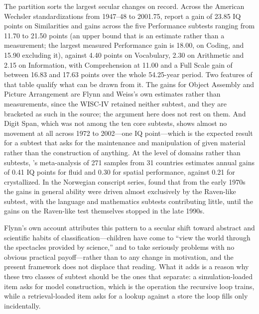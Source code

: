 \documentclass[12pt,a4paper]{article}
\begin{document}
The partition sorts the largest secular changes on record. Across the American Wechsler standardizations from 1947--48 to 2001.75, \citet[Table 2]{FlynnWeiss2007} report a gain of 23.85 IQ points on Similarities and gains across the five Performance subtests ranging from 11.70 to 21.50 points (an upper bound that is an estimate rather than a measurement; the largest measured Performance gain is 18.00, on Coding, and 15.90 excluding it), against 4.40 points on Vocabulary, 2.30 on Arithmetic and 2.15 on Information, with Comprehension at 11.00 and a Full Scale gain of between 16.83 and 17.63 points over the whole 54.25-year period. Two features of that table qualify what can be drawn from it. The gains for Object Assembly and Picture Arrangement are Flynn and Weiss's own estimates rather than measurements, since the WISC-IV retained neither subtest, and they are bracketed as such in the source; the argument here does not rest on them. And Digit Span, which was not among the ten core subtests, shows almost no movement at all across 1972 to 2002---\hspace{0pt}one IQ point---\hspace{0pt}which is the expected result for a subtest that asks for the maintenance and manipulation of given material rather than the construction of anything. At the level of domains rather than subtests, \citeauthor{PietschnigVoracek2015}'s \citeyearpar{PietschnigVoracek2015} meta-analysis of 271 samples from 31 countries estimates annual gains of 0.41 IQ points for fluid and 0.30 for spatial performance, against 0.21 for crystallized. In the Norwegian conscript series, \citet{Sundet2004} found that from the early 1970s the gains in general ability were driven almost exclusively by the Raven-like subtest, with the language and mathematics subtests contributing little, until the gains on the Raven-like test themselves stopped in the late 1990s.

Flynn's own account \citep{FlynnWeiss2007,Flynn2007} attributes this pattern to a secular shift toward abstract and scientific habits of classification---\hspace{0pt}children have come to ``view the world through the spectacles provided by science,'' and to take seriously problems with no obvious practical payoff---\hspace{0pt}rather than to any change in motivation, and the present framework does not displace that reading. What it adds is a reason why these two classes of subtest should be the ones that separate: a simulation-loaded item asks for model construction, which is the operation the recursive loop trains, while a retrieval-loaded item asks for a lookup against a store the loop fills only incidentally.
\end{document}
